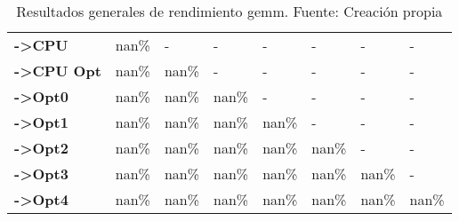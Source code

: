 \begin{table}[H]
\begin{tabular}{llllllll}
    \rowcolor[HTML]{EFEFEF} \cellcolor[HTML]{DAE8FC} \textbf{->CPU} & nan\% & - & - & - & - & - & - \\
    \cellcolor[HTML]{DAE8FC} \textbf{->CPU Opt} & nan\% & nan\% & - & - & - & - & - \\
    \rowcolor[HTML]{EFEFEF} \cellcolor[HTML]{DAE8FC} \textbf{->Opt0} & nan\% & nan\% & nan\% & - & - & - & - \\
    \cellcolor[HTML]{DAE8FC} \textbf{->Opt1} & nan\% & nan\% & nan\% & nan\% & - & - & - \\
    \rowcolor[HTML]{EFEFEF} \cellcolor[HTML]{DAE8FC} \textbf{->Opt2} & nan\% & nan\% & nan\% & nan\% & nan\% & - & - \\
    \cellcolor[HTML]{DAE8FC} \textbf{->Opt3} & nan\% & nan\% & nan\% & nan\% & nan\% & 	nan\% & - \\
    \rowcolor[HTML]{EFEFEF} \cellcolor[HTML]{DAE8FC} \textbf{->Opt4} & nan\% & nan\% & nan\% & nan\% & nan\% & 	nan\% & 	nan\% \\
    \end{tabular}
    \caption[Resultados generales de rendimiento gemm]{{Resultados generales de rendimiento gemm. Fuente: Creación propia}}
    \label{table_global_gemm_PerformanceResults_speedup}
\end{table}
